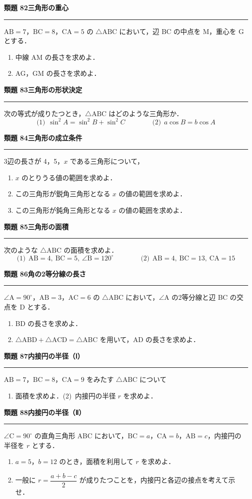 \documentclass[a4paper,11pt]{ltjsarticle}
\newcommand{\mon}[2]{\Needspace{7\baselineskip}\vspace{10pt}%
  {\sffamily\bfseries 類題 #1\quad #2\par}\vspace{2pt}\hrule\vspace{4pt}}
\begin{document}
\mon{82}{三角形の重心}
$\mathrm{AB}=7$，$\mathrm{BC}=8$，$\mathrm{CA}=5$ の $\triangle\mathrm{ABC}$ において，辺 BC の中点を M，重心を G とする．
\begin{enumerate}
\item 中線 AM の長さを求めよ．
\item AG，GM の長さを求めよ．
\end{enumerate}

\mon{83}{三角形の形状決定}
次の等式が成りたつとき，$\triangle\mathrm{ABC}$ はどのような三角形か．
\[\text{(1)}\ \ \sin^2A=\sin^2B+\sin^2C\qquad\qquad\text{(2)}\ \ a\cos B=b\cos A\]

\mon{84}{三角形の成立条件}
3辺の長さが 4，5，$x$ である三角形について，
\begin{enumerate}
\item $x$ のとりうる値の範囲を求めよ．
\item この三角形が鋭角三角形となる $x$ の値の範囲を求めよ．
\item この三角形が鈍角三角形となる $x$ の値の範囲を求めよ．
\end{enumerate}

\mon{85}{三角形の面積}
次のような $\triangle\mathrm{ABC}$ の面積を求めよ．
\[\text{(1)}\ \ \mathrm{AB}=4,\ \mathrm{BC}=5,\ \angle\mathrm B=120^\circ\qquad\qquad\text{(2)}\ \ \mathrm{AB}=4,\ \mathrm{BC}=13,\ \mathrm{CA}=15\]

\mon{86}{角の2等分線の長さ}
$\angle\mathrm A=90^\circ$，$\mathrm{AB}=3$，$\mathrm{AC}=6$ の $\triangle\mathrm{ABC}$ において，$\angle\mathrm A$ の2等分線と辺 BC の交点を D とする．
\begin{enumerate}
\item BD の長さを求めよ．
\item $\triangle\mathrm{ABD}+\triangle\mathrm{ACD}=\triangle\mathrm{ABC}$ を用いて，AD の長さを求めよ．
\end{enumerate}

\mon{87}{内接円の半径（Ⅰ）}
$\mathrm{AB}=7$，$\mathrm{BC}=8$，$\mathrm{CA}=9$ をみたす $\triangle\mathrm{ABC}$ について
\begin{enumerate}
\item 面積を求めよ．\qquad (2)\ 内接円の半径 $r$ を求めよ．
\end{enumerate}

\mon{88}{内接円の半径（Ⅱ）}
$\angle\mathrm C=90^\circ$ の直角三角形 ABC において，$\mathrm{BC}=a$，$\mathrm{CA}=b$，$\mathrm{AB}=c$，内接円の半径を $r$ とする．
\begin{enumerate}
\item $a=5$，$b=12$ のとき，面積を利用して $r$ を求めよ．
\item 一般に $r=\dfrac{a+b-c}{2}$ が成りたつことを，内接円と各辺の接点を考えて示せ．
\end{enumerate}
\end{document}
